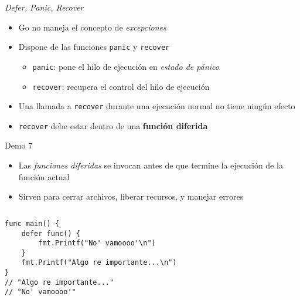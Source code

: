 \begin{frame}[fragile]{\emph{Defer, Panic, Recover}}
    \begin{itemize}
        \item Go no maneja el concepto de \emph{excepciones} 
        \item Dispone de las funciones \texttt{panic} y \texttt{recover}  
        \begin{itemize}
            \item \texttt{panic}: pone el hilo de ejecución en \emph{estado de pánico}  
            \item \texttt{recover}: recupera el control del hilo de ejecución 
        \end{itemize}
        \item Una llamada a \texttt{recover} durante una ejecución normal no tiene ningún efecto 
        \item \texttt{recover} debe estar dentro de una \textbf{función diferida}  
    \end{itemize}
\end{frame}



\begin{frame}[fragile]{Demo 7}

    \begin{itemize}
        \item Las \emph{funciones diferidas} se invocan antes de que termine la ejecución de la función actual
        \item Sirven para cerrar archivos, liberar recursos, y manejar errores
    \end{itemize}
{
    \renewcommand{\baselinestretch}{1} 

    \begin{columns}
        \begin{lstlisting}[title={Función diferida}]
func main() {
    defer func() {
        fmt.Printf("No' vamoooo'\n")
    }
    fmt.Printf("Algo re importante...\n")
}
// "Algo re importante..."
// "No' vamoooo'"
        \end{lstlisting}
    \end{columns}
}

\end{frame}

